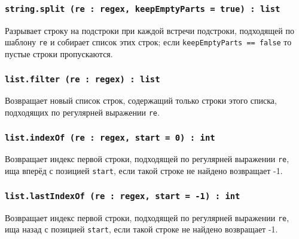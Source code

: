 \subsubsection{\texttt{string.split (re : regex, keepEmptyParts = true) : list}}

Разрывает строку на подстроки при каждой встречи подстроки, подходящей по шаблону \texttt{re} и собирает список этих строк; если \texttt{keepEmptyParts == false} то пустые строки пропускаются.

\subsubsection{\texttt{list.filter (re : regex) : list}}

Возвращает новый список строк, содержащий только строки этого списка, подходящих по регулярней выражении \texttt{re}.

\subsubsection{\texttt{list.indexOf (re : regex, start = 0) : int}}

Возвращает индекс первой строки, подходящей по регулярней выражении \texttt{re}, ища вперёд с позицией \texttt{start}, если такой строке не найдено возвращает -1.

\subsubsection{\texttt{list.lastIndexOf (re : regex, start = -1) : int}}

Возвращает индекс первой строки, подходящей по регулярней выражении \texttt{re}, ища назад с позицией \texttt{start}, если такой строке не найдено возвращает -1.


